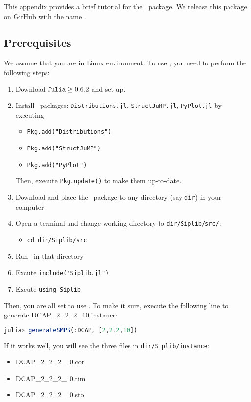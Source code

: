 This appendix provides a brief tutorial for the \julia\ package. We release this package on GitHub with the name \siplibjl.

\subsection{Prerequisites}
We assume that you are in Linux environment. To use \siplibjl, you need to perform the following steps:
\begin{enumerate}
	\item Download $\texttt{Julia}\ge 0.6.2$ and set up.
	\item Install \julia\ packages: \texttt{Distributions.jl}, \texttt{StructJuMP.jl}, \texttt{PyPlot.jl} by executing
	\begin{itemize}
		\item \texttt{Pkg.add("Distributions")}
		\item \texttt{Pkg.add("StructJuMP")}
		\item \texttt{Pkg.add("PyPlot")}
	\end{itemize}
	Then, execute \texttt{Pkg.update()} to make them up-to-date.
	\item Download and place the \siplibjl\ package to any directory (say \texttt{dir}) in your computer
	\item Open a terminal and change working directory to \texttt{dir/Siplib/src/}:
	\begin{itemize}
		\item \texttt{cd dir/Siplib/src}	
	\end{itemize}
	\item Run \julia\ in that directory
	\item Excute \texttt{include("Siplib.jl")}
	\item Excute \texttt{using Siplib}
\end{enumerate}
Then, you are all set to use \siplibjl. To make it sure, execute the following line to generate DCAP\_2\_2\_2\_10 instance:
\begin{lstlisting}[frame=single,language=julia]
julia> generateSMPS(:DCAP, [2,2,2,10])
\end{lstlisting}
If it works well, you will see the three files in \texttt{dir/Siplib/instance}:
\begin{itemize}
	\item DCAP\_2\_2\_2\_10.cor
	\item DCAP\_2\_2\_2\_10.tim
	\item DCAP\_2\_2\_2\_10.sto
\end{itemize}


